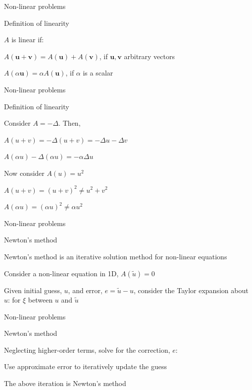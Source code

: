 \documentclass[18pt,xcolor=table]{beamer}
\begin{document}
\begin{frame}{Non-linear problems}
\begin{block}{Definition of linearity}
\bit
\item $A$ is linear if:
\bit
\item $A(\mathbf{u} + \mathbf{v}) = A(\mathbf{u}) + A(\mathbf{v})$, if $\mathbf{u},\mathbf{v}$ arbitrary vectors
\item $A(\alpha\mathbf{u}) = \alpha A(\mathbf{u})$, if $\alpha$ is a scalar
\eit
\eit
\end{block}
\end{frame}

\begin{frame}{Non-linear problems}
\begin{block}{Definition of linearity}
\bit
\item Consider $A = -\Delta$. Then,
\bit
\item $A(u + v) = -\Delta(u + v) = -\Delta u - \Delta v$
\item $A(\alpha u) -\Delta (\alpha u) = -\alpha \Delta u$
\eit
\item Now consider $A(u) = u^2$
\bit
\item $A(u + v) = (u + v)^2 \neq u^2 + v^2$
\item $A(\alpha u) = (\alpha u)^2 \neq \alpha u^2$
\eit
\eit
\end{block}
\end{frame}

\begin{frame}{Non-linear problems}
\begin{block}{Newton's method}
\bit
\item Newton's method is an iterative solution method for non-linear equations
\item Consider a non-linear equation in 1D, $A(\tilde{u}) = 0$
\item Given initial guess, $u$, and error, $e = \tilde{u} - u$, consider the Taylor expansion about $u$:
for $\xi$ between $u$ and $\tilde{u}$
\eit
\end{block}
\end{frame}

\begin{frame}{Non-linear problems}
\begin{block}{Newton's method}
\bit
\item Neglecting higher-order terms, solve for the correction, $e$:
\item Use approximate error to iteratively update the guess
\item The above iteration is Newton's method
\eit
\end{block}
\end{frame}
\end{document}
